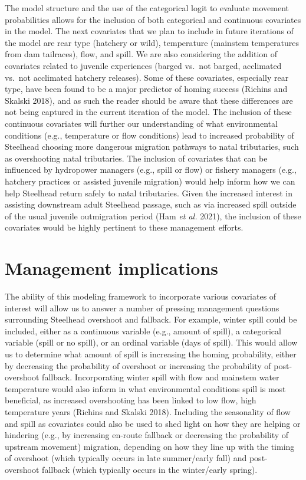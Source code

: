 \documentclass[
  12pt,
]{report}
\begin{document}
The model structure and the use of the categorical logit to evaluate
movement probabilities allows for the inclusion of both categorical and
continuous covariates in the model. The next covariates that we plan to
include in future iterations of the model are rear type (hatchery or
wild), temperature (mainstem temperatures from dam tailraces), flow, and
spill. We are also considering the addition of covariates related to
juvenile experiences (barged vs.~not barged, acclimated vs.~not
acclimated hatchery releases). Some of these covariates, especially rear
type, have been found to be a major predictor of homing success (Richins
and Skalski 2018), and as such the reader should be aware that these
differences are not being captured in the current iteration of the
model. The inclusion of these continuous covariates will further our
understanding of what environmental conditions (e.g., temperature or
flow conditions) lead to increased probability of Steelhead choosing
more dangerous migration pathways to natal tributaries, such as
overshooting natal tributaries. The inclusion of covariates that can be
influenced by hydropower managers (e.g., spill or flow) or fishery
managers (e.g., hatchery practices or assisted juvenile migration) would
help inform how we can help Steelhead return safely to natal
tributaries. Given the increased interest in assisting downstream adult
Steelhead passage, such as via increased spill outside of the usual
juvenile outmigration period (Ham \emph{et al.} 2021), the inclusion of
these covariates would be highly pertinent to these management efforts.

\hypertarget{management-implications}{%
\chapter{Management implications}\label{management-implications}}

The ability of this modeling framework to incorporate various covariates
of interest will allow us to answer a number of pressing management
questions surrounding Steelhead overshoot and fallback. For example,
winter spill could be included, either as a continuous variable (e.g.,
amount of spill), a categorical variable (spill or no spill), or an
ordinal variable (days of spill). This would allow us to determine what
amount of spill is increasing the homing probability, either by
decreasing the probability of overshoot or increasing the probability of
post-overshoot fallback. Incorporating winter spill with flow and
mainstem water temperature would also inform in what environmental
conditions spill is most beneficial, as increased overshooting has been
linked to low flow, high temperature years (Richins and Skalski 2018).
Including the seasonality of flow and spill as covariates could also be
used to shed light on how they are helping or hindering (e.g., by
increasing en-route fallback or decreasing the probability of upstream
movement) migration, depending on how they line up with the timing of
overshoot (which typically occurs in late summer/early fall) and
post-overshoot fallback (which typically occurs in the winter/early
spring).
\end{document}
